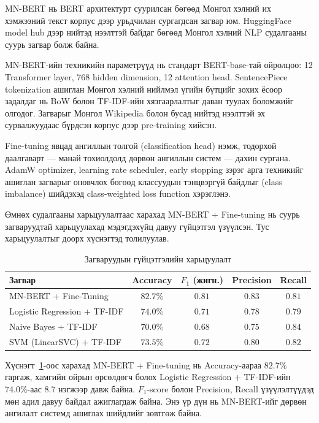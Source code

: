 MN-BERT нь BERT архитектурт суурилсан бөгөөд Монгол хэлний их хэмжээний текст
корпус дээр урьдчилан сургагдсан загвар юм. HuggingFace model hub дээр нийтэд
нээлттэй байдаг бөгөөд Монгол хэлний NLP судалгааны суурь загвар болж байна.

MN-BERT-ийн техникийн параметрүүд нь стандарт BERT-base-тай ойролцоо: 12
Transformer layer, 768 hidden dimension, 12 attention head. SentencePiece
tokenization ашиглан Монгол хэлний нийлмэл үгийн бүтцийг зохих ёсоор задалдаг
нь BoW болон TF-IDF-ийн хязгаарлалтыг даван туулах боломжийг олгодог. Загварыг
Монгол Wikipedia болон бусад нийтэд нээлттэй эх сурвалжуудаас бүрдсэн корпус
дээр pre-training хийсэн.

Fine-tuning явцад ангиллын толгой (classification head) нэмж, тодорхой даалгаварт
--- манай тохиолдолд дөрвөн ангиллын систем --- дахин сургана. AdamW optimizer,
learning rate scheduler, early stopping зэрэг арга техникийг ашиглан загварыг
оновчлох бөгөөд классуудын тэнцвэргүй байдлыг (class imbalance) шийдэхэд
class-weighted loss function хэрэглэнэ.

Өмнөх судалгааны харьцуулалтаас \cite{jargalmaa2025} харахад MN-BERT +
Fine-tuning нь суурь загваруудтай харьцуулахад мэдэгдэхүйц давуу гүйцэтгэл
үзүүлсэн. Тус харьцуулалтыг доорх хүснэгтэд толилуулав.

\begin{table}[ht]
  \centering
  \caption{Загваруудын гүйцэтгэлийн харьцуулалт \cite{jargalmaa2025}}
  \label{tab:model-comparison}
  \begin{tabular}{lcccc}
    \toprule
    \textbf{Загвар} & \textbf{Accuracy} & \textbf{$F_1$ (жигн.)} &
    \textbf{Precision} & \textbf{Recall} \\
    \midrule
    MN-BERT + Fine-Tuning          & $82.7\%$ & $0.81$ & $0.83$ & $0.81$ \\
    Logistic Regression + TF-IDF   & $74.0\%$ & $0.71$ & $0.78$ & $0.79$ \\
    Naive Bayes + TF-IDF           & $70.0\%$ & $0.68$ & $0.75$ & $0.84$ \\
    SVM (LinearSVC) + TF-IDF      & $73.5\%$ & $0.72$ & $0.80$ & $0.82$ \\
    \bottomrule
  \end{tabular}
\end{table}

Хүснэгт~\ref{tab:model-comparison}-оос харахад MN-BERT + Fine-tuning нь
Accuracy-аараа $82.7\%$ гаргаж, хамгийн ойрын өрсөлдөгч болох Logistic
Regression + TF-IDF-ийн $74.0\%$-аас 8.7 нэгжээр давж байна. $F_1$-score болон
Precision, Recall үзүүлэлтүүдэд мөн адил давуу байдал ажиглагдаж байна. Энэ үр
дүн нь MN-BERT-ийг дөрвөн ангилалт системд ашиглах шийдлийг зөвтгөж байна.

